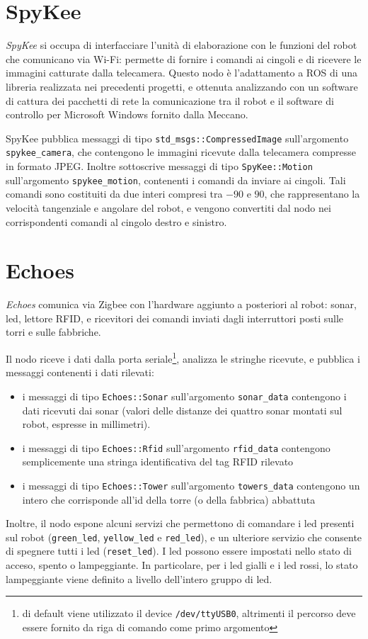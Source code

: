 \section{SpyKee}
\emph{SpyKee} si occupa di interfacciare l'unità di elaborazione con le funzioni del robot che comunicano via Wi-Fi: permette di fornire i comandi ai cingoli e di ricevere le immagini catturate dalla telecamera. Questo nodo è l'adattamento a ROS di una libreria realizzata nei precedenti progetti, e ottenuta analizzando con un software di cattura dei pacchetti di rete la comunicazione tra il robot e il software di controllo per Microsoft Windows fornito dalla Meccano.

SpyKee pubblica messaggi di tipo \verb|std_msgs::CompressedImage| sull'argomento \verb|spykee_camera|, che contengono le immagini ricevute dalla telecamera compresse in formato JPEG. Inoltre sottoscrive messaggi di tipo \verb|SpyKee::Motion| sull'argomento \verb|spykee_motion|, contenenti i comandi da inviare ai cingoli. Tali comandi sono costituiti da due interi compresi tra $-90$ e $90$, che rappresentano la velocità tangenziale e angolare del robot, e vengono convertiti dal nodo nei corrispondenti comandi al cingolo destro e sinistro.

\section{Echoes}
\emph{Echoes} comunica via Zigbee con l'hardware aggiunto a posteriori al robot: sonar, led, lettore RFID, e ricevitori dei comandi inviati dagli interruttori posti sulle torri e sulle fabbriche.

Il nodo riceve i dati dalla porta seriale\footnote{di default viene utilizzato il device \texttt{/dev/ttyUSB0}, altrimenti il percorso deve essere fornito da riga di comando come primo argomento}, analizza le stringhe ricevute, e pubblica i messaggi contenenti i dati rilevati:
\begin{itemize}
	\item i messaggi di tipo \verb|Echoes::Sonar| sull'argomento \verb|sonar_data| contengono i dati ricevuti dai sonar (valori delle distanze dei quattro sonar montati sul robot, espresse in millimetri).
	\item i messaggi di tipo \verb|Echoes::Rfid| sull'argomento \verb|rfid_data| contengono semplicemente una stringa identificativa del tag RFID rilevato
	\item i messaggi di tipo \verb|Echoes::Tower| sull'argomento \verb|towers_data| contengono un intero che corrisponde all'id della torre (o della fabbrica) abbattuta
\end{itemize}
Inoltre, il nodo espone alcuni servizi che permettono di comandare i led presenti sul robot (\verb|green_led|, \verb|yellow_led| e \verb|red_led|), e un ulteriore servizio che consente di spegnere tutti i led (\verb|reset_led|). I led possono essere impostati nello stato di acceso, spento o lampeggiante. In particolare, per i led gialli e i led rossi, lo stato lampeggiante viene definito a livello dell'intero gruppo di led.

